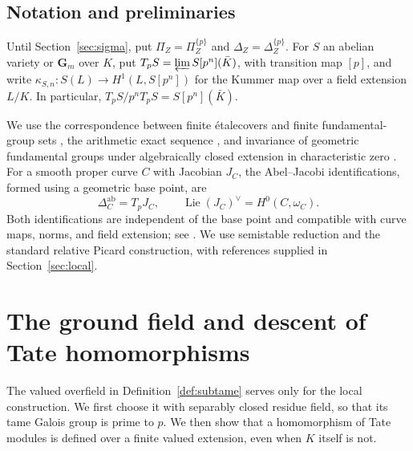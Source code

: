 \documentclass[11pt,a4paper]{article}
\numberwithin{equation}{section}
\theoremstyle{plain}
\theoremstyle{definition}
\theoremstyle{remark}
\newcommand{\Gm}{\mathbf G_m}
\newcommand{\etale}{\'etale}
\newcommand{\ab}{\mathrm{ab}}
\DeclareMathOperator{\Lie}{Lie}
\begin{document}
\subsection*{Notation and preliminaries}

Until Section~\ref{sec:sigma}, put $\Pi_Z=\Pi_Z^{\{p\}}$ and
$\Delta_Z=\Delta_Z^{\{p\}}$. For $S$ an abelian variety or $\Gm$ over $K$, put
$T_pS=\varprojlim S[p^n](\bar K)$, with transition map $[p]$, and write
$\kappa_{S,n}:S(L)\to H^1(L,S[p^n])$ for the Kummer map over a field
extension $L/K$.
In particular, $T_pS/p^nT_pS=S[p^n](\bar K)$.

We use the correspondence between finite \etale covers and finite
fundamental-group sets \cite[Expos\'e~V]{SGA1}, the arithmetic exact
sequence \cite[Expos\'e~IX, Th\'eor\`eme~6.1]{SGA1}, and invariance of
geometric fundamental groups under algebraically closed extension in
characteristic zero \cite[Expos\'e~XIII, Corollaire~3.2 and
Remarque~3.1.3]{SGA1}. For a smooth proper curve
$C$ with Jacobian $J_C$, the Abel--Jacobi identifications, formed using a
geometric base point, are
\begin{equation}
 \Delta_C^{\ab}=T_pJ_C,\qquad
 \Lie(J_C)^\vee=H^0(C,\omega_C).
 \label{eq:AJ}
\end{equation}
Both identifications are independent of the base point and compatible with
curve maps, norms, and field extension; see \cite[Propositions~2.2 and~9.1]{Milne1986}.
We use semistable reduction and the standard relative Picard construction,
with references supplied in Section~\ref{sec:local}.

\section{The ground field and descent of Tate homomorphisms}
\label{sec:fields}

The valued overfield in Definition~\ref{def:subtame} serves only for the
local construction. We first choose it with separably closed residue field,
so that its tame Galois group is prime to $p$. We then show that a
homomorphism of Tate modules is defined over a finite valued extension,
even when $K$ itself is not.
\end{document}
